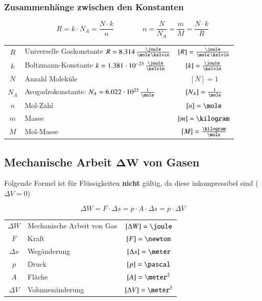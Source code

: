 	
\subsubsection{Zusammenhänge zwischen den Konstanten}
	
\vspace{-0.2cm}

$$ \boxed{ R = k \cdot N_A = \frac{N \cdot k}{n} } \qquad \qquad \boxed{ n = \frac{N}{N_A} = \frac{m}{M} = \frac{N \cdot k}{R} }$$
	

\renewcommand{\arraystretch}{1.3}
\begin{tabular}{c l c}
	$R$		& Universelle Gaskonstante $R = 8.314 \, \frac{\joule}{\mole \, \kelvin}$ 	& $[R] = \frac{\joule}{\mole \, \kelvin}$ 	\\
	$k$		& Boltzmann-Konstante $k = 1.381 \cdot 10^{-23} \, \frac{\joule}{\kelvin}$ 	& $[k] = \frac{\joule}{\kelvin}$			\\
	$N$ 	& Anzahl Moleküle 															& $[N] = 1$ 								\\
	$N_A$ 	& Avogadrokonstante: $N_A = 6.022 \cdot 10^{23} \, \frac{1}{\mole}$ 		& $[N_A] = \frac{1}{\mole}$					\\	
	$n$ 	& Mol-Zahl 																	& $[n] = \mole$ 							\\
	$m$ 	& Masse 																	& $[m] = \kilogram$ 						\\
	$M$ 	& Mol-Masse 																& $[M] = \frac{\kilogram}{\mole}$
\end{tabular}
\renewcommand{\arraystretch}{1}



\subsection[Mechanische Arbeit von Gasen]{Mechanische Arbeit $\bm{\Delta W}$ von Gasen}
\label{MechArbeit}

Folgende Formel ist für Flüssigkeiten \textbf{nicht} gültig, da diese inkompressibel sind ($\Delta V = 0$)

$$ \boxed{ \Delta W = F \cdot \Delta s = p \cdot A \cdot \Delta s = p \cdot \Delta V } $$


\begin{tabular}{c l c}
	$\Delta W$ 	& Mechanische Arbeit von Gas	& $[\Delta W] = \joule$		\\
	$F$ 		& Kraft 						& $[F] = \newton$ 			\\
	$\Delta s$ 	& Wegänderung 					& $[\Delta s] = \meter$ 	\\
	$p$ 		& Druck 						& $[p] = \pascal$ 			\\
	$A$ 		& Fläche 						& $[A] = \meter^2$ 			\\
	$\Delta V$ 	& Volumenänderung 				& $[\Delta V] = \meter^3$
\end{tabular}


